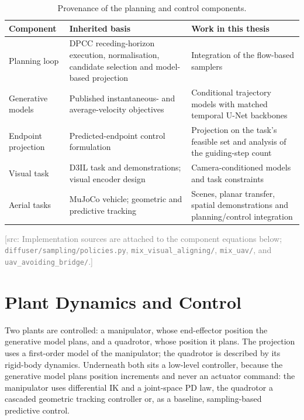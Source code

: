 \documentclass[headsepline,footsepline,footinclude=false,oneside,fontsize=11pt,paper=a4,listof=totoc,bibliography=totoc]{scrbook}
\theoremstyle{definition}
\theoremstyle{plain}
\theoremstyle{remark}
\newif\ifsubmission
\newcommand{\srcnote}[1]{\ifsubmission\else\textcolor{gray}{\footnotesize\textsf{[src: #1]}}\fi}
\begin{document}
\begin{table}[htpb]
  \caption[Method provenance]{Provenance of the planning and control components.}
  \label{tab:method-provenance}
  \centering\small
  \begin{tabularx}{\linewidth}{lLL}
    \toprule
    Component & Inherited basis & Work in this thesis \\
    \midrule
    Planning loop & DPCC receding-horizon execution, normalisation, candidate selection and
      model-based projection \parencite{romer2025diffusion} & Integration of the flow-based samplers \\
    Generative models & Published instantaneous- and average-velocity objectives
      \parencite{lipman2023flow,geng2025meanflow,zhang2025alphaflow} & Conditional trajectory models
      with matched temporal U-Net backbones \\
    Endpoint projection & Predicted-endpoint control formulation \parencite{li2025hardflow}
      & Projection on the task's feasible set and analysis of the guiding-step count \\
    Visual task & D3IL task and demonstrations; visual encoder design
      \parencite{jia2024towards,chi2023diffusion} & Camera-conditioned models and task constraints \\
    Aerial tasks & MuJoCo vehicle; geometric and predictive tracking
      \parencite{zakka2022menagerie,lee2010geometric,howell2022predictive}
      & Scenes, planar transfer, spatial demonstrations and planning/control integration \\
    \bottomrule
  \end{tabularx}
\end{table}
\srcnote{Implementation sources are attached to the component equations below;
\texttt{diffuser/sampling/policies.py}, \texttt{mix\_visual\_aligning/},
\texttt{mix\_uav/}, and \texttt{uav\_avoiding\_bridge/}.}

\section{Plant Dynamics and Control}\label{sec:method:dynamics}\label{sec:method:deployment}

Two plants are controlled: a manipulator, whose end-effector position the generative model plans, and
a quadrotor, whose position it plans. The projection uses a first-order model of the manipulator; the
quadrotor is described by its rigid-body dynamics. Underneath both sits a low-level controller, because
the generative model plans position increments and never an actuator command: the manipulator uses
differential \ac{IK} and a joint-space \ac{PD} law, the quadrotor a cascaded geometric tracking controller
or, as a baseline, sampling-based predictive control.
\end{document}
